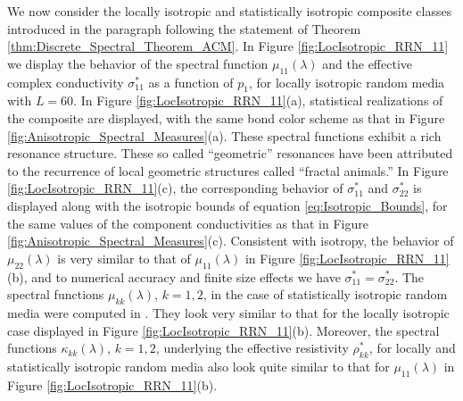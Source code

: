 \documentclass{cmslatex}
\begin{document}
We now consider the locally isotropic and statistically isotropic
composite classes introduced 
in the paragraph following the statement of Theorem
\ref{thm:Discrete_Spectral_Theorem_ACM}. In Figure
\ref{fig:LocIsotropic_RRN_11} we display the behavior of the 
spectral function $\mu_{11}(\lambda)$ and the effective complex conductivity
$\sigma^*_{11}$ as a function of $p_1$, for locally isotropic random media
with $L=60$. In Figure \ref{fig:LocIsotropic_RRN_11}(a), statistical
realizations of the composite are displayed, with the same
bond color scheme as that in Figure
\ref{fig:Anisotropic_Spectral_Measures}(a). These
spectral functions exhibit a rich resonance structure. These so called
``geometric'' resonances have been attributed
\cite{Jonckheere_Luck_JPA_1998} to the recurrence of local geometric
structures called ``fractal animals.''  In Figure
\ref{fig:LocIsotropic_RRN_11}(c), the corresponding behavior of
$\sigma^*_{11}$ and $\sigma^*_{22}$ is displayed along with the isotropic bounds
of equation \eqref{eq:Isotropic_Bounds}, for the same values of the
component conductivities as that in Figure
\ref{fig:Anisotropic_Spectral_Measures}(c). Consistent with  
isotropy, the behavior of $\mu_{22}(\lambda)$ is very similar to that of
$\mu_{11}(\lambda)$ in Figure \ref{fig:LocIsotropic_RRN_11}(b), and to
numerical accuracy and finite size effects we have
$\sigma^*_{11}=\sigma^*_{22}$. The spectral functions $\mu_{kk}(\lambda)$, $k=1,2$, in
the case of statistically isotropic random media were computed in
\cite{Murphy:JMP:063506}. They look very similar to that for the
locally isotropic case displayed in Figure
\ref{fig:LocIsotropic_RRN_11}(b). Moreover, the spectral functions
$\kappa_{kk}(\lambda)$, $k=1,2$, underlying the effective resistivity $\rho^*_{kk}$,
for locally and statistically isotropic random media also look quite
similar to that for $\mu_{11}(\lambda)$ in Figure
\ref{fig:LocIsotropic_RRN_11}(b). 
\end{document}
